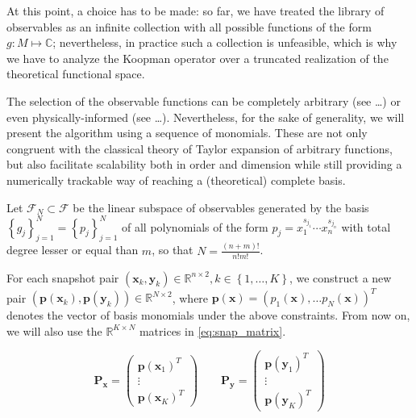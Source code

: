 \documentclass{article}
\begin{document}
        At this point, a choice has to be made: so far, we have treated the library of observables as an infinite collection with all possible functions of the form $g:M \mapsto \mathbb{C}$; nevertheless, in practice such a collection is unfeasible, which is why we have to analyze the Koopman operator over a truncated realization of the theoretical functional space.

        The selection of the observable functions can be completely arbitrary (see \dots) or even physically-informed (see \dots). Nevertheless, for the sake of generality, we will present the algorithm using a sequence of monomials. These are not only congruent with the classical theory of Taylor expansion of arbitrary functions, but also facilitate scalability both in order and dimension while still providing a numerically trackable way of reaching a (theoretical) complete basis.

        Let $\mathcal{F}_N \subset \mathcal{F}$ be the linear subspace of observables generated by the basis $\left\{g_j\right\}_{j=1}^{N} = \left\{p_j\right\}_{j=1}^{N}$ of all polynomials of the form $p_j = x_1^{s_{j_1}} \cdots x_n^{s_{j_n}}$ with total degree lesser or equal than $m$, so that $N = \frac{(n+m)!}{n!m!}$.

        For each snapshot pair $\left(\mathbf{x}_k,\mathbf{y}_k\right) \in \mathbb{R}^{n \times 2} , k \in \left\{1,\dots,K\right\}$, we construct a new pair $\left(\mathbf{p}\left(\mathbf{x}_k\right),\mathbf{p}\left(\mathbf{y}_k\right)\right) \in \mathbb{R}^{N \times 2}$, where $\mathbf{p}\left(\mathbf{x}\right) = \left(p_1\left(\mathbf{x}\right) , \dots p_N\left(\mathbf{x}\right)\right)^T$ denotes the vector of basis monomials under the above constraints. From now on, we will also use the $\mathbb{R}^{K \times N}$ matrices in \cref{eq:snap_matrix}.

        \begin{equation} \label{eq:snap_matrix}
            \mathbf{P_x} =
            \begin{pmatrix}
                \mathbf{p}\left(\mathbf{x}_1\right)^T \\
                \vdots \\
                \mathbf{p}\left(\mathbf{x}_K\right)^T
            \end{pmatrix}
            \qquad
            \mathbf{P_y} =
            \begin{pmatrix}
                \mathbf{p}\left(\mathbf{y}_1\right)^T \\
                \vdots \\
                \mathbf{p}\left(\mathbf{y}_K\right)^T
            \end{pmatrix}
        \end{equation}
\end{document}
